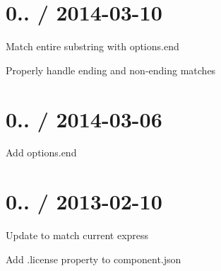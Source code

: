 \section*{0.. / 2014-\/03-\/10 }


\begin{DoxyItemize}
\item Match entire substring with {\ttfamily options.\+end}
\item Properly handle ending and non-\/ending matches
\end{DoxyItemize}

\section*{0.. / 2014-\/03-\/06 }


\begin{DoxyItemize}
\item Add {\ttfamily options.\+end}
\end{DoxyItemize}

\section*{0.. / 2013-\/02-\/10 }


\begin{DoxyItemize}
\item Update to match current express
\item Add .license property to component.\+json 
\end{DoxyItemize}